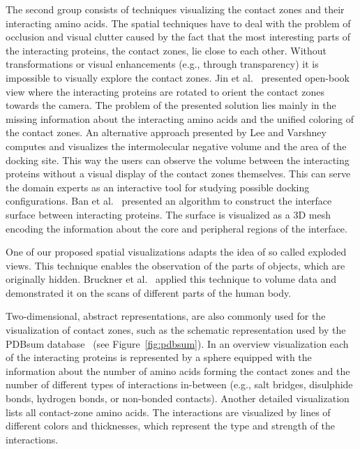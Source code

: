 \documentclass[twocolumn]{bmcart}%
\begin{document}
The second group consists of techniques visualizing the contact zones and their interacting amino acids.
The spatial techniques have to deal with the problem of occlusion and visual clutter caused by the fact that the most interesting parts of the interacting proteins, the contact zones, lie close to each other.
Without transformations or visual enhancements (e.g., through transparency) it is impossible to visually explore the contact zones.
Jin et al.~\cite{Jin2014} presented open-book view where the interacting proteins are rotated to orient the contact zones towards the camera.
The problem of the presented solution lies mainly in the missing information about the interacting amino acids and the unified coloring of the contact zones.
An alternative approach presented by Lee and Varshney~\cite{Varshney2003} computes and visualizes the intermolecular negative volume and the area of the docking site.%
This way the users can observe the volume between the interacting proteins without a visual display of the contact zones themselves.
This can serve the domain experts as an interactive tool for studying possible docking configurations.
Ban et al.~\cite{Ban2006} presented an algorithm to construct the interface surface between interacting proteins.
The surface is visualized as a 3D mesh encoding the information about the core and peripheral regions of the interface.

One of our proposed spatial visualizations adapts the idea of so called exploded views.
This technique enables the observation of the parts of objects, which are originally hidden.
Bruckner et al.~\cite{Bruckner2006} applied this technique to volume data and demonstrated it on the scans of different parts of the human body.

Two-dimensional, abstract representations, are also commonly used for the visualization of contact zones, such as the schematic representation used by the PDBsum database~\cite{pdbsum} (see Figure~\ref{fig:pdbsum}).
In an overview visualization each of the interacting proteins is represented by a sphere equipped with the information about the number of amino acids forming the contact zones and the number of different types of interactions in-between (e.g., salt bridges, disulphide bonds, hydrogen bonds, or non-bonded contacts).
Another detailed visualization lists all contact-zone amino acids. 
The interactions are visualized by lines of different colors and thicknesses, which represent the type and strength of the interactions.
\end{document}
